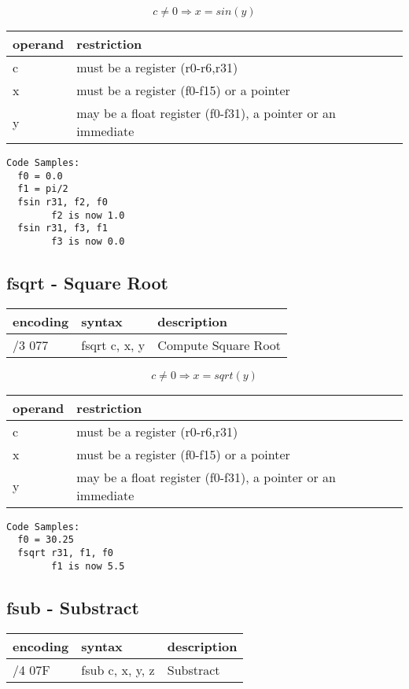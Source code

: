 \documentclass[letterpaper,10pt,openright,twoside,onecolumn]{book}
\begin{document}
  \begin{displaymath} c \neq 0 \Rightarrow x = sin(y)\end{displaymath}

  \flushleft
  \begin{tabular}{|l|l|}
   \hline
    operand & restriction \\
   \hline
    c & must be a register (r0-r6,r31) \\
    x & must be a register (f0-f15) or a pointer \\
    y & may be a float register (f0-f31), a pointer or an immediate \\
   \hline
  \end{tabular}

  \begin{verbatim}
Code Samples:
  f0 = 0.0
  f1 = pi/2
  fsin r31, f2, f0
        f2 is now 1.0
  fsin r31, f3, f1
        f3 is now 0.0
  \end{verbatim}
\newpage\subsection{fsqrt - Square Root}
  \begin{tabular}{|l|l|l|}
   \hline
    encoding & syntax & description \\
   \hline
    /3 077 & fsqrt c, x, y & Compute Square Root\\
   \hline
  \end{tabular}

  \begin{displaymath} c \neq 0 \Rightarrow x = sqrt(y)\end{displaymath}

  \flushleft
  \begin{tabular}{|l|l|}
   \hline
    operand & restriction \\
   \hline
    c & must be a register (r0-r6,r31) \\
    x & must be a register (f0-f15) or a pointer \\
    y & may be a float register (f0-f31), a pointer or an immediate \\
   \hline
  \end{tabular}

  \begin{verbatim}
Code Samples:
  f0 = 30.25
  fsqrt r31, f1, f0
        f1 is now 5.5
  \end{verbatim}
\newpage\subsection{fsub - Substract}
  \begin{tabular}{|l|l|l|}
   \hline
    encoding & syntax & description \\
   \hline
    /4 07F & fsub c, x, y, z & Substract \\
   \hline
  \end{tabular}
\end{document}
